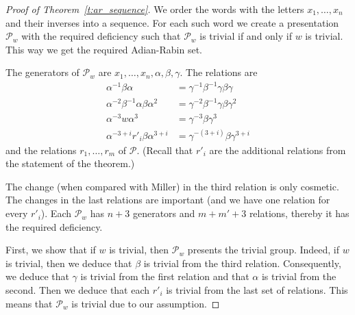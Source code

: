 \documentclass[10pt,a4paper]{article}
\theoremstyle{definition}
\theoremstyle{remark}
\newcommand\PP{\mathcal{P}}
\begin{document}
\begin{proof}[Proof of Theorem~\ref{t:ar_sequence}]
We order the words with the letters $x_1, \dots, x_n$ and their inverses into a
sequence. For each such word we create a presentation $\PP_w$ with the required
deficiency such that $\PP_w$ is trivial if and only if $w$ is trivial. This way
we get the required Adian-Rabin set. 

The generators of $\PP_w$ are $x_1, \dots, x_n, \alpha, \beta, \gamma$. The
  relations are
\begin{align}
  \alpha^{-1} \beta \alpha &= \gamma^{-1}\beta^{-1}\gamma\beta\gamma
  \label{eq:miller_1}\\
  \alpha^{-2}\beta^{-1}\alpha\beta\alpha^{2} &= 
  \gamma^{-2}\beta^{-1}\gamma\beta\gamma^{2} \\
  \alpha^{-3}w\alpha^{3} &= \gamma^{-3}\beta\gamma^3 \\
  \alpha^{-3+i}r'_i\beta\alpha^{3+i} &= \gamma^{-(3+i)}\beta\gamma^{3+i}
  \label{eq:miller_4}
\end{align}
  and the relations $r_1, \dots, r_m$ of $\PP$. (Recall that $r'_i$ are
  the additional relations from the statement of the theorem.)
  
  The change (when compared with Miller) in the third relation is only cosmetic. The changes in the last
  relations are important (and we have one relation for every $r'_i$). Each
  $\PP_w$ has $n+3$ generators and $m + m' + 3$ relations, thereby it has the
  required deficiency.  

First, we show that if $w$ is trivial, then $\PP_w$ presents the trivial group.
Indeed, if $w$ is trivial, then we deduce that $\beta$ is trivial from the
  third relation. Consequently, we deduce that $\gamma$ is trivial from the
  first relation and that $\alpha$ is trivial from the second. Then we deduce
  that each $r'_i$ is trivial from the last set of relations. This means that
  $\PP_w$ is trivial due to our assumption. 


\end{proof}
\end{document}
